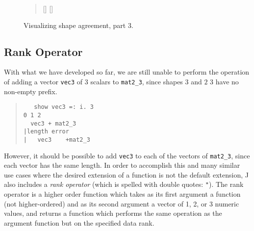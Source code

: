 \begin{figure}[hptbp]\ContinuedFloat
\begin{quote}
\begin{singlespacing}
\begin{small}
[\PartLineWidth]{
}%
\hfill%
[\PartLineWidth]{
} 
\end{small}
\end{singlespacing}
\end{quote}
\caption{Visualizing shape agreement, part 3.}
\label{fig:agree3}
\end{figure}

\pagebreak

\subsection{Rank Operator}
With what we have developed so far, we are still unable to perform the operation of 
adding a vector \texttt{vec3} of 3 scalars to \texttt{mat2\_3}, since shapes $3$ and $2$ $3$ have no non-empty prefix.

\begin{quote}
\begin{singlespacing}
\begin{small}
\begin{verbatim}
   show vec3 =: i. 3
0 1 2
  vec3 + mat2_3
|length error
|   vec3    +mat2_3
\end{verbatim}
\end{small}
\end{singlespacing}
\end{quote}

\noindent However, it should be possible to add \texttt{vec3} to each of the vectors of \texttt{mat2\_3}, since each vector has the same length.
In order to accomplish this and many similar use cases where the desired extension of a function is not the default extension, 
J also includes a \textit{rank operator} (which is spelled with double quotes: \texttt{"}).
The rank operator is a higher order function which takes as its first argument a function (not higher-ordered) %
and as its second argument a vector of 1, 2, or 3 numeric values, 
and returns a function which performs the same operation as the argument function but on the specified data rank\cite{rankanduni}.

